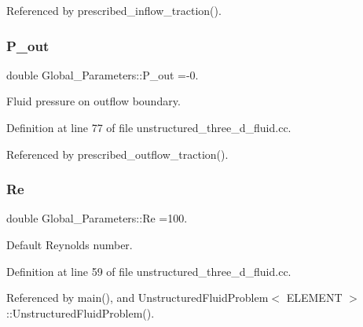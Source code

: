 Referenced by prescribed\+\_\+inflow\+\_\+traction().

\mbox{\label{namespaceGlobal__Parameters_ac680ed856897793d54c9c867da19169c}} 
\subsubsection{\texorpdfstring{P\+\_\+out}{P\_out}}
{\footnotesize\ttfamily double Global\+\_\+\+Parameters\+::\+P\+\_\+out =-\/0.}



Fluid pressure on outflow boundary. 



Definition at line 77 of file unstructured\+\_\+three\+\_\+d\+\_\+fluid.\+cc.



Referenced by prescribed\+\_\+outflow\+\_\+traction().

\mbox{\label{namespaceGlobal__Parameters_a9d72e94a9305c6a310940a6a427ebe06}} 
\subsubsection{\texorpdfstring{Re}{Re}}
{\footnotesize\ttfamily double Global\+\_\+\+Parameters\+::\+Re =100.}



Default Reynolds number. 



Definition at line 59 of file unstructured\+\_\+three\+\_\+d\+\_\+fluid.\+cc.



Referenced by main(), and Unstructured\+Fluid\+Problem$<$ E\+L\+E\+M\+E\+N\+T $>$\+::\+Unstructured\+Fluid\+Problem().

